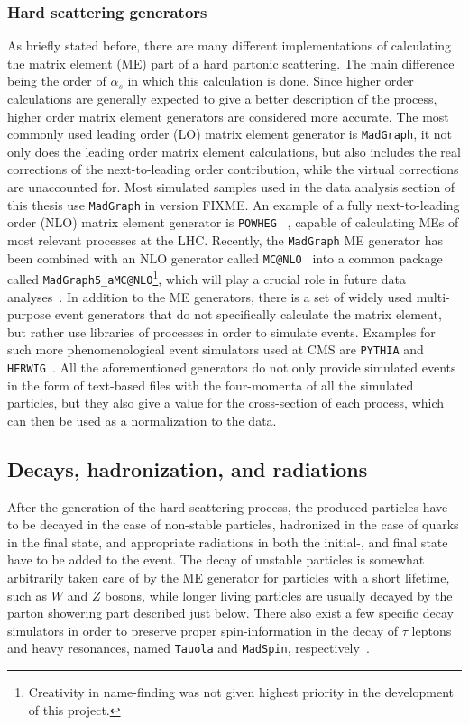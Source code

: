\subsubsection*{Hard scattering generators}
As briefly stated before, there are many different implementations of calculating the matrix element (ME) part of a hard partonic scattering. The main difference being the order of
$\alpha_s$ in which this calculation is done. Since higher order calculations are generally expected to give a better description of the process, higher order matrix element
generators are considered more accurate. The most commonly used leading order (LO) matrix element generator is \texttt{MadGraph}\cite{madgraph}, it not only does the leading order
matrix element calculations, but also includes the real corrections of the next-to-leading order contribution, while the virtual corrections are unaccounted for. Most simulated
samples used in the data analysis section of this thesis use \texttt{MadGraph} in version FIXME. An example of a fully next-to-leading order (NLO) matrix element generator is 
\texttt{POWHEG} ~\cite{powheg}, capable of calculating MEs of most relevant processes at the LHC. Recently, the \texttt{MadGraph} ME generator has been combined with an NLO 
generator called \texttt{MC@NLO}~\cite{mcatnlo} into a common package called \texttt{MadGraph5\_aMC@NLO}\footnote{Creativity in name-finding was not given highest priority in the development
of this project.}, which will play a crucial role in future data analyses~\cite{madgraphamcatnlo}. In addition to the ME generators, there is a set of widely used multi-purpose event
generators that do not specifically calculate the matrix element, but rather use libraries of processes in order to simulate events. Examples for such more phenomenological event simulators
used at CMS are \texttt{PYTHIA} and \texttt{HERWIG}~\cite{pythia,herwig}. 
All the aforementioned generators do not only provide simulated events in the form of text-based files with the four-momenta of all the simulated particles, but they also give a
value for the cross-section of each process, which can then be used as a normalization to the data.

\subsection{Decays, hadronization, and radiations}
\label{sub:hadr}
After the generation of the hard scattering process, the produced particles have to be decayed in the case of non-stable particles, hadronized in the case of quarks in the final state, 
and appropriate radiations in both the initial-, and final state have to be added to the event. The decay of unstable particles is somewhat arbitrarily taken care of by the ME generator
for particles with a short lifetime, such as $W$ and $Z$ bosons, while longer living particles are usually decayed by the parton showering part described just below. There also exist a
few specific decay simulators in order to preserve proper spin-information in the decay of $\tau$ leptons and heavy resonances, named \texttt{Tauola} and \texttt{MadSpin}, 
respectively~\cite{tauola,madspin}.

